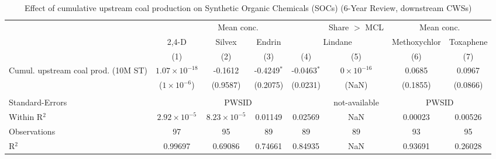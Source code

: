 
\begin{table}[htbp]
   
   \caption{\label{tab:6yr_huc02fe_soc} Effect of cumulative upstream coal production on Synthetic Organic Chemicals (SOCs) (6-Year Review, downstream CWSs)}
   \bigskip
   
   \centering
   
   \begin{adjustbox}{width = \textwidth, center}
      
      
      \begin{tabular}{lccccccc}
         \toprule
         
          & \multicolumn{4}{c}{Mean conc.} & Share $>$ MCL & \multicolumn{2}{c}{Mean conc.}\\
         
          & 2,4-D & Silvex & Endrin & \multicolumn{2}{c}{Lindane} & Methoxychlor & Toxaphene \\ 
         
                                             & (1)                    & (2)                   & (3)           & (4)           & (5)                 & (6)           & (7)\\  
         
         \midrule 
         Cumul. upstream coal prod. (10M ST) & $1.07\times 10^{-18}$  & -0.1612               & -0.4249$^{*}$ & -0.0463$^{*}$ & $0\times 10^{-16}$  & 0.0685        & 0.0967\\   
                                             & ($1\times 10^{-6}$)    & (0.9587)              & (0.2075)      & (0.0231)      & (NaN)               & (0.1855)      & (0.0866)\\   
         
          \\
         
         Standard-Errors & \multicolumn{4}{c}{PWSID} & not-available & \multicolumn{2}{c}{PWSID} \\ 
         Within R$^2$                        & $2.92\times 10^{-5}$   & $8.23\times 10^{-5}$  & 0.01149       & 0.02569       & NaN                 & 0.00023       & 0.00526\\  
         Observations                        & 97                     & 95                    & 89            & 89            & 89                  & 93            & 95\\  
         R$^2$                               & 0.99697                & 0.69086               & 0.74661       & 0.84935       & NaN                 & 0.93691       & 0.26028\\  
         

\end{tabular}
\end{adjustbox}
\end{table}
